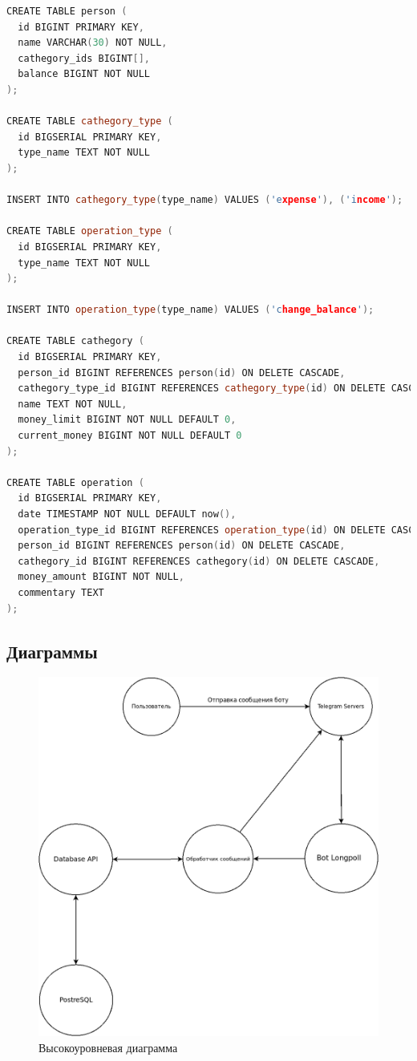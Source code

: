 \documentclass[12pt]{extarticle}
\begin{document}
\begin{lstlisting}[language=C++,style=mystyle,caption=class ReturningResultHandler]
CREATE TABLE person (
  id BIGINT PRIMARY KEY,
  name VARCHAR(30) NOT NULL,
  cathegory_ids BIGINT[],
  balance BIGINT NOT NULL
);

CREATE TABLE cathegory_type (
  id BIGSERIAL PRIMARY KEY,
  type_name TEXT NOT NULL
);

INSERT INTO cathegory_type(type_name) VALUES ('expense'), ('income');

CREATE TABLE operation_type (
  id BIGSERIAL PRIMARY KEY,
  type_name TEXT NOT NULL
);

INSERT INTO operation_type(type_name) VALUES ('change_balance');

CREATE TABLE cathegory (
  id BIGSERIAL PRIMARY KEY,
  person_id BIGINT REFERENCES person(id) ON DELETE CASCADE,
  cathegory_type_id BIGINT REFERENCES cathegory_type(id) ON DELETE CASCADE,
  name TEXT NOT NULL,
  money_limit BIGINT NOT NULL DEFAULT 0,
  current_money BIGINT NOT NULL DEFAULT 0
);

CREATE TABLE operation (
  id BIGSERIAL PRIMARY KEY,
  date TIMESTAMP NOT NULL DEFAULT now(),
  operation_type_id BIGINT REFERENCES operation_type(id) ON DELETE CASCADE,
  person_id BIGINT REFERENCES person(id) ON DELETE CASCADE,
  cathegory_id BIGINT REFERENCES cathegory(id) ON DELETE CASCADE,
  money_amount BIGINT NOT NULL,
  commentary TEXT
);
\end{lstlisting}

\pagebreak

\subsection{Диаграммы}

\begin{figure}[!htb]
    \caption{Высокоуровневая диаграмма}
    \centering
    \includegraphics[scale=0.4]{High_level.png}
\end{figure}
\end{document}
